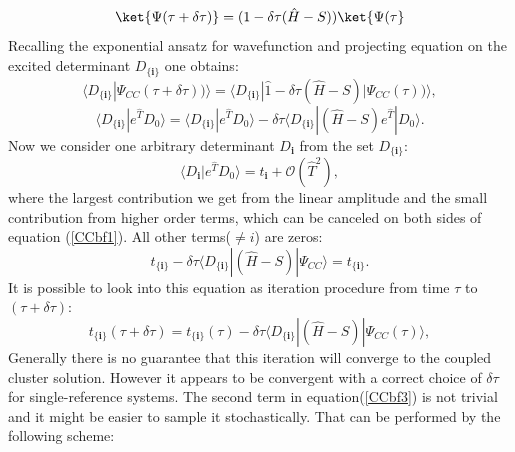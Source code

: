 \documentclass[twoside,english]{uiofysmaster}
\begin{document}
\begin{equation}
	\ket{\Psi(\tau + \delta \tau)} = (1- \delta \tau(\hat{H}-S)) \ket{\Psi(\tau}
\end{equation}
Recalling the exponential ansatz for wavefunction and projecting equation on the excited determinant $D_{\{\boldsymbol{i}\}}$ one obtains:
\begin{equation}
\langle D_{\{\boldsymbol{i}\}}|\Psi_{CC}(\tau + \delta \tau))\rangle = \langle D_{\{\boldsymbol{i}\}}|\hat{1} - \delta \tau (\hat{H}-S)|\Psi_{CC}(\tau))\rangle,
\end{equation}
\begin{equation}\label{CCbf1}
\langle D_{\{\boldsymbol{i}\}}|e^{\hat{T}}D_0\rangle = \langle D_{\{\boldsymbol{i}\}}|e^{\hat{T}}D_0\rangle - \delta \tau \langle D_{\{\boldsymbol{i}\}}|(\hat{H}-S)e^{\hat{T}}|D_0\rangle.
\end{equation}
Now we consider one arbitrary determinant $D_{\boldsymbol{i}}$ from the set $D_{\{\boldsymbol{i}\}}$:
\begin{equation}
\langle D_{\boldsymbol{i}}|e^{\hat{T}}D_0\rangle = t_{\boldsymbol{i}} + \mathcal{O}(\hat{T}^2),
\end{equation}
where the largest contribution we get from the linear amplitude and the small contribution from higher order terms, which can be canceled on both sides of equation (\ref{CCbf1}). All other terms($\neq i$) are zeros:
\begin{equation}\label{CCbf2}
t_{\{\boldsymbol{i}\}} - \delta \tau \langle D_{\{\boldsymbol{i}\}}|(\hat{H}-S)|\Psi_{CC}\rangle = t_{\{\boldsymbol{i}\}}.
\end{equation}
It is possible to look into this equation as iteration procedure from time $\tau$ to $(\tau + \delta \tau)$: 
\begin{equation}\label{CCbf3}
t_{\{\boldsymbol{i}\}}(\tau + \delta \tau) = t_{\{\boldsymbol{i}\}}(\tau) - \delta \tau \langle D_{\{\boldsymbol{i}\}}|(\hat{H}-S)|\Psi_{CC}(\tau)\rangle,
\end{equation}
Generally there is no guarantee that this iteration will converge to the coupled cluster solution. However it appears to be convergent with a correct choice of $\delta \tau$ for single-reference systems\cite{SpencerDevelopmentsstochasticcoupled2016}. The second term in equation(\ref{CCbf3}) is not trivial and it might be easier to sample it stochastically. That can be performed by the following scheme:
\end{document}
